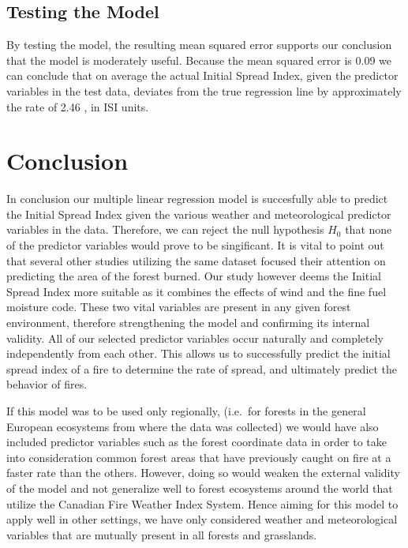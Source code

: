 \documentclass[conference,final,]{IEEEtran}
\begin{document}
\hypertarget{testing-the-model}{%
\subsection{Testing the Model}\label{testing-the-model}}

By testing the model, the resulting mean squared error supports our
conclusion that the model is moderately useful. Because the mean squared
error is 0.09 we can conclude that on average the actual Initial Spread
Index, given the predictor variables in the test data, deviates from the
true regression line by approximately the rate of 2.46 , in ISI units.

\hypertarget{conclusion}{%
\section{Conclusion}\label{conclusion}}

In conclusion our multiple linear regression model is succesfully able
to predict the Initial Spread Index given the various weather and
meteorological predictor variables in the data. Therefore, we can reject
the null hypothesis \(H_{0}\) that none of the predictor variables would
prove to be singificant. It is vital to point out that several other
studies utilizing the same dataset focused their attention on predicting
the area of the forest burned. Our study however deems the Initial
Spread Index more suitable as it combines the effects of wind and the
fine fuel moisture code. These two vital variables are present in any
given forest environment, therefore strengthening the model and
confirming its internal validity. All of our selected predictor
variables occur naturally and completely independently from each other.
This allows us to successfully predict the initial spread index of a
fire to determine the rate of spread, and ultimately predict the
behavior of fires.

If this model was to be used only regionally, (i.e.~for forests in the
general European ecosystems from where the data was collected) we would
have also included predictor variables such as the forest coordinate
data in order to take into consideration common forest areas that have
previously caught on fire at a faster rate than the others. However,
doing so would weaken the external validity of the model and not
generalize well to forest ecosystems around the world that utilize the
Canadian Fire Weather Index System. Hence aiming for this model to apply
well in other settings, we have only considered weather and
meteorological variables that are mutually present in all forests and
grasslands.
\end{document}
